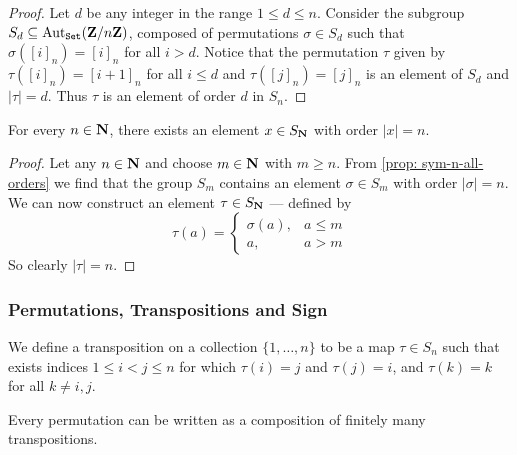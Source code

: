 \begin{proof}
Let \(d\) be any integer in the range \(1 \leq d \leq n\). Consider the
subgroup \(S_d \subseteq \operatorname{Aut}_{{\texttt{Set}}}(\mathbf{Z}/n\mathbf{Z})\), composed of permutations
\(\sigma \in S_d\) such that \(\sigma([i]_n) = [i]_n\) for all \(i > d\).
Notice that the permutation \(\tau\) given by \(\tau([i]_n) = [i + 1]_n\) for
all \(i \leq d\) and \(\tau([j]_n) = [j]_n\) is an element of \(S_d\) and
\(|\tau| = d\). Thus \(\tau\) is an element of order \(d\) in \(S_n\).
\end{proof}

\begin{corollary}
For every \(n \in \mathbf{N}\), there exists an element \(x \in S_{\mathbf{N}}\) with
order \(|x| = n\).
\end{corollary}

\begin{proof}
Let any \(n \in \mathbf{N}\) and choose \(m \in \mathbf{N}\) with \(m \geq n\). From
\cref{prop: sym-n-all-orders} we find that the group \(S_m\) contains
an element \(\sigma \in S_m\) with order \(|\sigma| = n\). We can now
construct an element \(\tau \in S_{\mathbf{N}}\) --- defined by
\[
  \tau(a) =
  \begin{cases}
    \sigma(a), &a \leq m \\
    a, &a > m
  \end{cases}
\]
So clearly \(|\tau| = n\).
\end{proof}

\subsubsection{Permutations, Transpositions and Sign}

\begin{definition}[Transposition]
\label{def: transposition}
We define a transposition on a collection \(\{1, \dots, n\}\) to be a map
\(\tau \in S_n\) such that exists indices \(1 \leq i < j \leq n\)
for which \(\tau(i) = j\) and \(\tau(j) = i\), and \(\tau(k) = k\) for all
\(k \neq i, j\).
\end{definition}

\begin{proposition}\label{prop: permutations to transpositions}
Every permutation can be written as a composition of finitely many
transpositions.
\end{proposition}

